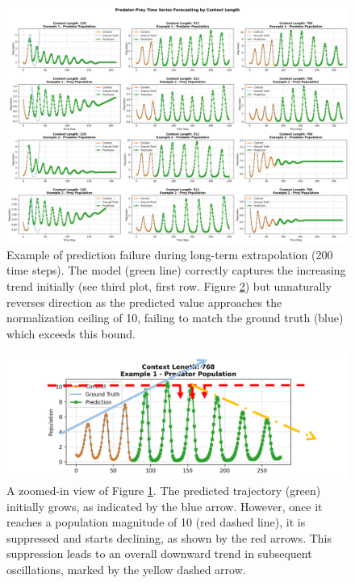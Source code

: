 \documentclass{article}
\begin{document}
\begin{figure}[!h] %
    \centering
    \includegraphics[width=0.8\linewidth]{M2 Course Work//Images/problem_long_sequence.png} %
    \caption{Example of prediction failure during long-term extrapolation (200 time steps). The model (green line) correctly captures the increasing trend initially (see third plot, first row. Figure \ref{fig:zoomed-up-sequence}) but unnaturally reverses direction as the predicted value approaches the normalization ceiling of 10, failing to match the ground truth (blue) which exceeds this bound.}
    \label{fig:long_term_prediction_failure} %
\end{figure}

\begin{figure}[!htbp]
    \centering
    \includegraphics[width=0.75\linewidth]{M2 Course Work//Images/zoomed_up_sequence.png}
    \caption{A zoomed-in view of Figure \ref{fig:long_term_prediction_failure}. The predicted trajectory (green) initially grows, as indicated by the blue arrow. However, once it reaches a population magnitude of 10 (red dashed line), it is suppressed and starts declining, as shown by the red arrows. This suppression leads to an overall downward trend in subsequent oscillations, marked by the yellow dashed arrow.}
    \label{fig:zoomed-up-sequence}
\end{figure}
\end{document}
